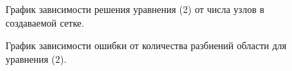 \documentclass[a4paper,12pt]{article}
\theoremstyle{plain} %
\theoremstyle{definition} %
\theoremstyle{remark} %
\theoremstyle{definition}
\theoremstyle{definition}
\begin{document}
\begin{figure}[H]
\begin{minipage}[h]{0.47\linewidth}
				\end{minipage}
				\hfill
				\begin{minipage}[h]{0.47\linewidth}
				\end{minipage}
				\caption{График зависимости решения уравнения (2) от числа узлов в создаваемой сетке.}
				\label{ris:func_2_res}
			\end{figure}
		
		\begin{figure}[H]
			\caption{График зависимости ошибки от количества разбиений области для уравнения (2).}
		\end{figure}
		
\end{document}
